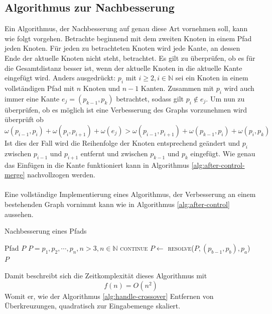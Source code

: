 \subsection{Algorithmus zur Nachbesserung}
Ein Algorithmus, der Nachbesserung auf genau diese Art vornehmen soll, kann wie folgt vorgehen.
Betrachte beginnend mit dem zweiten Knoten in einem Pfad jeden Knoten.
Für jeden zu betrachteten Knoten wird jede Kante, an dessen Ende der aktuelle Knoten nicht steht, betrachtet.
Es gilt zu überprüfen, ob es für die Gesamtdistanz besser ist, wenn der aktuelle Knoten in die aktuelle Kante eingefügt wird.
Anders ausgedrückt: $p_i$ mit $i \geq 2,i\in\mathbb{N}$ sei ein Knoten in einem vollständigen Pfad mit $n$ Knoten und $n-1$ Kanten. Zusammen mit $p_i$ wird auch immer eine Kante $e_j=(p_{k-1},p_{k})$ betrachtet, sodass gilt $p_i \not \in e_j$.
Um nun zu überprüfen, ob es möglich ist eine Verbesserung des Graphs vorzunehmen wird überprüft ob 
$$\omega(p_{i-1},p_{i}) + \omega(p_{i},p_{i+1}) + \omega(e_j) > \omega(p_{i-1},p_{i+1}) + \omega(p_{k-1},p_i) + \omega(p_i,p_{k})$$
Ist dies der Fall wird die Reihenfolge der Knoten entsprechend geändert und $p_i$ zwischen $p_{i-1}$ und $p_{i+1}$ entfernt und zwischen $p_{k-1}$ und $p_k$ eingefügt. Wie genau das Einfügen in die Kante funktioniert kann in Algorithmus \vref{alg:after-control-merge} nachvollzogen werden.
\\\\
Eine vollständige Implementierung eines Algorithmus, der Verbesserung an einem bestehenden Graph vornimmt kann wie in Algorithmus \vref{alg:after-control} aussehen.
\begin{algorithm}[h]
    \caption{Nachbesserung eines Pfads}
    \label{alg:after-control}
    \begin{algorithmic}[1]
        \Require Pfad $P$
        \Require $P=p_1,p_2,\cdots,p_n,n>3,n\in \mathbb{N}$
                    \State \textsc{continue}
                \EndIf
                    \State $P \gets$ \textsc{resolve}($P, (p_{b-1}, p_b), p_a$)
                \EndIf
            \EndFor
        \EndFor\\
        \Return $P$

    \end{algorithmic}
\end{algorithm}
Damit beschreibt sich die Zeitkomplexität dieses Algorithmus mit 
$$f(n) = O(n^2)$$
Womit er, wie der Algorithmus \vref{alg:handle-crossover} Entfernen von Überkreuzungen, quadratisch zur Eingabemenge skaliert.
